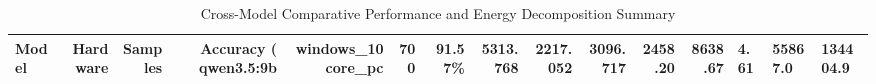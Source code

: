 \begin{table}[t]
\centering
\small
\begin{tabular}{lrrrrrrrrrrr}
\toprule
Model & Hardware & Samples & Accuracy (%
\midrule
qwen3.5:9b & windows\_10core\_pc & 700 & 91.57\% & 5313.768 & 2217.052 & 3096.717 & 2458.20 & 8638.67 & 4.61 & 55867.0 & 134404.9 \\
\bottomrule
\end{tabular}
\caption{Cross-Model Comparative Performance and Energy Decomposition Summary}
\label{tab:1_model_comparison}
\end{table}
